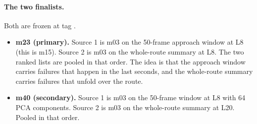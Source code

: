 \paragraph{The two finalists.}
Both are frozen at tag .
\begin{itemize}
  \item \textbf{m23 (primary).} Source 1 is m03 on the 50-frame approach window
        at L8 (this is m15). Source 2 is m03 on the whole-route summary at L8.
        The two ranked lists are pooled in that order.
        The idea is that the
        approach window carries failures that happen in the last seconds, and
        the whole-route summary carries failures that unfold over the route.
  \item \textbf{m40 (secondary).} Source 1 is m03 on the 50-frame window at L8
        with 64 PCA components. Source 2 is m03 on the whole-route summary at
        L20. Pooled in that order.
\end{itemize}


